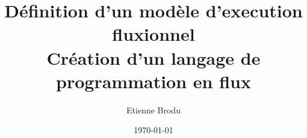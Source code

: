 \documentclass[final,10pt]{article}
\author{Etienne Brodu}
\date{\today}
\title{Définition d'un modèle d'execution fluxionnel\\
\small{Création d'un langage de programmation en flux}}
\begin{document}
\maketitle
\newpage

\tableofcontents{}
\newpage




% 
% 
\end{document}
